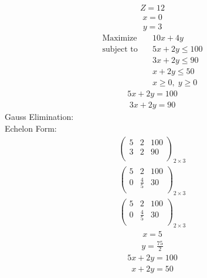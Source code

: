 \documentclass{article}
\begin{document}
\begin{align*}
Z=12\end{align*}
\begin{align*}
x=0\end{align*}
\begin{align*}
y=3\end{align*}
\begin{align*}
\text{Maximize} \quad & 10x + 4y\\
\text{subject to} \quad
& 5x + 2y\le100\\
& 3x + 2y\le90\\
& x + 2y\le50\\
& x\ge0,\; y\ge0\end{align*}
\begin{align*}
5x + 2y=100\end{align*}
\begin{align*}
3x + 2y=90\end{align*}
Gauss Elimination:\\
Echelon Form:\\
\begin{align*}
\left(
\begin{array}{cc|c}
5 & 2 & 100\\
3 & 2 & 90\\
\end{array}
\right)_{2\times 3}
\end{align*}
\begin{align*}
\left(
\begin{array}{cc|c}
5 & 2 & 100\\
0 & \frac{4}{5} & 30\\
\end{array}
\right)_{2\times 3}
\end{align*}
\begin{align*}
\left(
\begin{array}{cc|c}
5 & 2 & 100\\
0 & \frac{4}{5} & 30\\
\end{array}
\right)_{2\times 3}
\end{align*}
\begin{align*}
x=5\end{align*}
\begin{align*}
y=\frac{75}{2}\end{align*}
\begin{align*}
5x + 2y=100\end{align*}
\begin{align*}
x + 2y=50\end{align*}
\end{document}
